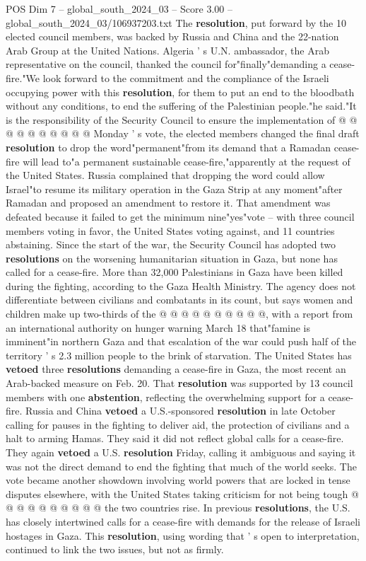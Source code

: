 \begin{textsample}{POS Dim 7 – global\_south\_2024\_03 – Score 3.00 – global\_south\_2024\_03/106937203.txt}
The \textbf{resolution}, put forward by the 10 elected council members, was backed by Russia and China and the 22-nation Arab Group at the United Nations.
Algeria ' s U.N. ambassador, the Arab representative on the council, thanked the council for"finally"demanding a cease-fire."We look forward to the commitment and the compliance of the Israeli occupying power with this \textbf{resolution}, for them to put an end to the bloodbath without any conditions, to end the suffering of the Palestinian people."he said."It is the responsibility of the Security Council to ensure the implementation of @ @ @ @ @ @ @ @ @ @ Monday ' s vote, the elected members changed the final draft \textbf{resolution} to drop the word"permanent"from its demand that a Ramadan cease-fire will lead to"a permanent sustainable cease-fire,"apparently at the request of the United States.
Russia complained that dropping the word could allow Israel"to resume its military operation in the Gaza Strip at any moment"after Ramadan and proposed an amendment to restore it.
That amendment was defeated because it failed to get the minimum nine"yes"vote -- with three council members voting in favor, the United States voting against, and 11 countries abstaining.
Since the start of the war, the Security Council has adopted two \textbf{resolutions} on the worsening humanitarian situation in Gaza, but none has called for a cease-fire.
More than 32,000 Palestinians in Gaza have been killed during the fighting, according to the Gaza Health Ministry.
The agency does not differentiate between civilians and combatants in its count, but says women and children make up two-thirds of the @ @ @ @ @ @ @ @ @ @, with a report from an international authority on hunger warning March 18 that"famine is imminent"in northern Gaza and that escalation of the war could push half of the territory ' s 2.3 million people to the brink of starvation.
The United States has \textbf{vetoed} three \textbf{resolutions} demanding a cease-fire in Gaza, the most recent an Arab-backed measure on Feb. 20.
That \textbf{resolution} was supported by 13 council members with one \textbf{abstention}, reflecting the overwhelming support for a cease-fire.
Russia and China \textbf{vetoed} a U.S.-sponsored \textbf{resolution} in late October calling for pauses in the fighting to deliver aid, the protection of civilians and a halt to arming Hamas.
They said it did not reflect global calls for a cease-fire.
They again \textbf{vetoed} a U.S. \textbf{resolution} Friday, calling it ambiguous and saying it was not the direct demand to end the fighting that much of the world seeks.
The vote became another showdown involving world powers that are locked in tense disputes elsewhere, with the United States taking criticism for not being tough @ @ @ @ @ @ @ @ @ @ the two countries rise.
In previous \textbf{resolutions}, the U.S. has closely intertwined calls for a cease-fire with demands for the release of Israeli hostages in Gaza.
This \textbf{resolution}, using wording that ' s open to interpretation, continued to link the two issues, but not as firmly.

\end{textsample}
